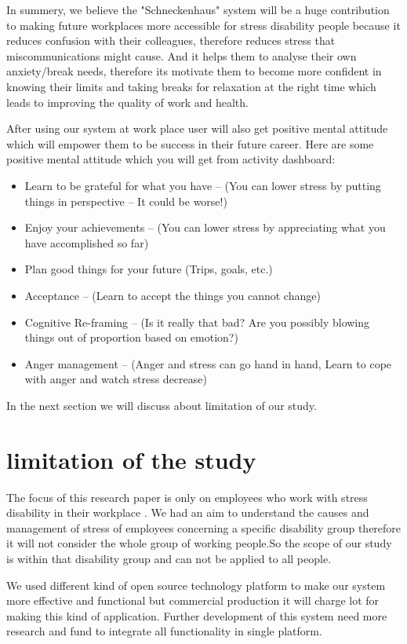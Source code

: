 In summery, we believe the "Schneckenhaus" system will be a huge contribution to making future workplaces more accessible for stress disability people because it reduces confusion with their colleagues, therefore reduces stress that miscommunications might cause. And it helps them to analyse their own anxiety/break needs, therefore its motivate them to become more confident in knowing their limits and taking breaks for relaxation at the right time which leads to improving the quality of work and health.

After using our system at work place user will also get positive mental attitude which will empower them to be success in their future career. Here are some positive mental attitude which you will get from activity dashboard:
    \begin{itemize}
        \item Learn to be grateful for what you have – (You can lower stress by putting things in perspective – It could be worse!)
        \item Enjoy your achievements – (You can lower stress by appreciating what you have accomplished so far)
        \item Plan good things for your future (Trips, goals, etc.)
        \item Acceptance – (Learn to accept the things you cannot change)
        \item Cognitive Re-framing – (Is it really that bad? Are you possibly blowing things out of proportion based on emotion?)
        \item Anger management – (Anger and stress can go hand in hand, Learn to cope with anger and watch stress decrease)
    \end{itemize}
    
In the next section we will discuss about limitation of our study.


\section{limitation of the study}
The focus of this research paper is only on employees who work with stress disability in their workplace . We had an aim to understand the causes and management of stress of employees concerning a specific disability group therefore it will not consider the whole group of working people.So the scope of our study is within that disability group and can not be applied to all people.

We used different kind of open source technology platform to make our system more effective and functional but commercial production it will charge lot for making this kind of application. Further development of this system need more research and fund to integrate all functionality in single platform. 


